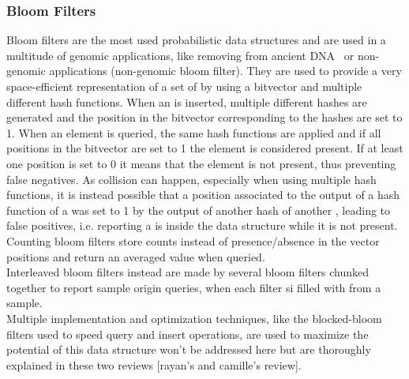 \subsubsection{Bloom Filters}
Bloom filters are the most used probabilistic data structures and are used in a multitude of genomic applications, like removing from ancient DNA~\cite{akmerbroom} or non-genomic applications (non-genomic bloom filter). They are used to provide a very space-efficient representation of a set of \kmers by using a bitvector and multiple different hash functions. When an \kmer is inserted, multiple different hashes are generated and the position in the bitvector corresponding to the hashes are set to 1. When an element is queried, the same hash functions are applied and if all positions in the bitvector are set to 1 the element is considered present. If at least one position is set to 0 it means that the element is not present, thus preventing false negatives. As collision can happen, especially when using multiple hash functions, it is instead possible that a position associated to the output of a hash function of a \kmer was set to 1 by the output of another hash of another \kmer, leading to false positives, i.e. reporting a \kmer is inside the data structure while it is not present.\\
Counting bloom filters store counts instead of presence/absence in the vector positions and return an averaged value when queried.\\
Interleaved bloom filters instead are made by several bloom filters chunked together to report sample origin queries, when each filter si filled with \kmers from a sample.\\
Multiple implementation and optimization techniques, like the blocked-bloom filters used to speed query and insert operations, are used to maximize the potential of this data structure won't be addressed here but are thoroughly explained in these two reviews [rayan's and camille's review]. 

